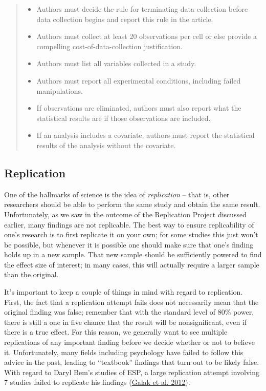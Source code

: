 \documentclass[
  12pt,
]{book}
\providecommand{\tightlist}{%
  \setlength{\itemsep}{0pt}\setlength{\parskip}{0pt}}
\begin{document}
\begin{quote}
\begin{itemize}
\tightlist
\item
  Authors must decide the rule for terminating data collection before data collection begins and report this rule in the article.
\item
  Authors must collect at least 20 observations per cell or else provide a compelling cost-of-data-collection justification.
\item
  Authors must list all variables collected in a study.
\item
  Authors must report all experimental conditions, including failed manipulations.
\item
  If observations are eliminated, authors must also report what the statistical results are if those observations are included.
\item
  If an analysis includes a covariate, authors must report the statistical results of the analysis without the covariate.
\end{itemize}
\end{quote}

\hypertarget{replication}{%
\subsection{Replication}\label{replication}}

One of the hallmarks of science is the idea of \emph{replication} -- that is, other researchers should be able to perform the same study and obtain the same result. Unfortunately, as we saw in the outcome of the Replication Project discussed earlier, many findings are not replicable. The best way to ensure replicability of one's research is to first replicate it on your own; for some studies this just won't be possible, but whenever it is possible one should make sure that one's finding holds up in a new sample. That new sample should be sufficiently powered to find the effect size of interest; in many cases, this will actually require a larger sample than the original.

It's important to keep a couple of things in mind with regard to replication. First, the fact that a replication attempt fails does not necessarily mean that the original finding was false; remember that with the standard level of 80\% power, there is still a one in five chance that the result will be nonsignificant, even if there is a true effect. For this reason, we generally want to see multiple replications of any important finding before we decide whether or not to believe it. Unfortunately, many fields including psychology have failed to follow this advice in the past, leading to ``textbook'' findings that turn out to be likely false. With regard to Daryl Bem's studies of ESP, a large replication attempt involving 7 studies failed to replicate his findings (\protect\hyperlink{ref-gala:lebo:nels:2012}{Galak et al. 2012}).
\end{document}
